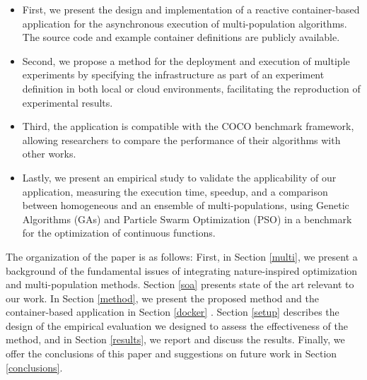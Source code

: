 \documentclass[review]{elsarticle}
\begin{document}
\begin{itemize}
    \item First, we present the design and implementation of a reactive 
    container-based application for the asynchronous execution of multi-population 
    algorithms. The source code and example container definitions are
    publicly available. %
    \item Second, we propose a method for the deployment and execution of 
    multiple experiments by specifying the infrastructure as part of an 
    experiment definition in both local or cloud environments,
    facilitating the reproduction of experimental results. %
    \item Third, the application is compatible with the COCO benchmark 
    framework, allowing researchers to compare the performance of their 
    algorithms with other works. %
    \item Lastly, we present an empirical study to validate the 
    applicability of our application,  measuring the execution time, 
    speedup, and a comparison between homogeneous and an ensemble of 
    multi-populations, using Genetic Algorithms (GAs) and Particle 
    Swarm Optimization (PSO) in a benchmark for the optimization of 
    continuous functions. %
\end{itemize}

The organization of the paper is as follows: First, in Section \ref{multi}, we present a
background of the fundamental issues of integrating nature-inspired optimization
and multi-population methods. Section \ref{soa} presents state of the art relevant to
our work. In Section \ref{method}, we present the proposed method and the container-based
application in Section \ref{docker} .  Section \ref{setup} describes
the design of the empirical evaluation we designed to assess the effectiveness
of the method, and in Section \ref{results}, we report and discuss the results. Finally, we
offer the conclusions of this paper and suggestions on future work in Section \ref{conclusions}.
\end{document}
